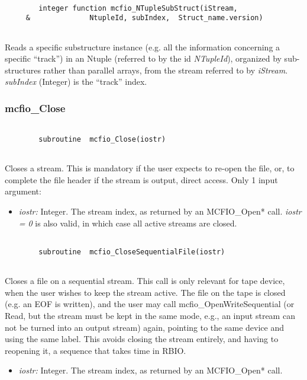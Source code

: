 \begin{verbatim}

        integer function mcfio_NTupleSubStruct(iStream,
     &              NtupleId, subIndex,  Struct_name.version)
     
\end{verbatim}

Reads a specific substructure instance (e.g. all the information concerning a
specific ``track'')  in an Ntuple (referred to by the id {\em NTupleId}), organized
by sub-structures rather than parallel arrays, from the stream referred to by {\em
iStream}.  {\em subIndex} (Integer) is the ``track'' index.  




\subsubsection{mcfio\_Close}

\begin{verbatim}

        subroutine  mcfio_Close(iostr)
    
\end{verbatim}

Closes a stream. This is mandatory if the user expects to re-open the  file,
or, to complete the file header if the stream is output, direct access. Only 
1 input argument:
\begin{itemize} 
\item {\em iostr:} Integer. The stream index, as returned by an MCFIO\_Open* 
call. {\em iostr = 0} is also valid, in which case all active streams are
closed.
\end{itemize}


\begin{verbatim}

        subroutine  mcfio_CloseSequentialFile(iostr)
    
\end{verbatim}

Closes a file on a sequential stream. This call is only relevant for 
tape device, when the user wishes to keep the stream active. The file 
on the tape is closed (e.g. an EOF is written), and the user may call 
mcfio\_OpenWriteSequential (or Read, but the stream must be kept in the 
same mode, e.g., an input stream can not be turned into an output stream) 
again, pointing to the same device and using the same label. This avoids 
closing the stream entirely, and having to reopening it, a sequence 
that takes time in RBIO. 
\begin{itemize} 
\item {\em iostr:} Integer. The stream index, as returned by an MCFIO\_Open* 
call.
\end{itemize}

